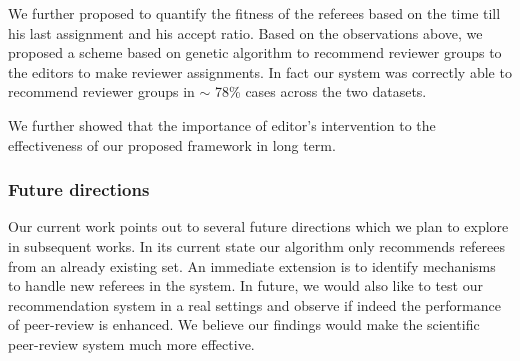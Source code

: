 We further proposed to quantify the fitness of the referees based on the time till his last assignment and his accept ratio. 
\fi
Based on the observations above, we proposed a scheme based on genetic algorithm to recommend reviewer groups to the editors 
to make reviewer assignments. In fact our system was correctly able to recommend reviewer groups in $\sim$ 78\% cases across the two datasets.

We further showed that the importance of editor's intervention to the effectiveness of our  proposed framework in long term. 
\subsubsection{Future directions}
Our current work points out to several future directions which we plan to explore in subsequent works. In its current state our algorithm only recommends referees from an already existing set. An immediate extension is to identify mechanisms to handle new referees in the system. In future, we would also like to test our recommendation system in a real settings and observe if indeed the performance of peer-review is enhanced. We believe our findings would make the scientific peer-review system much more effective.
\fi

\medskip
